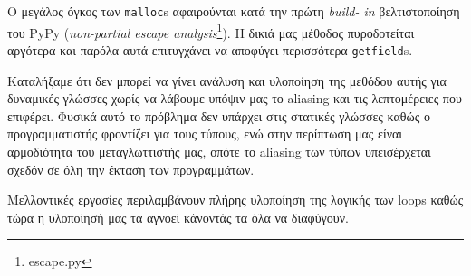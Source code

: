 Ο μεγάλος όγκος των \texttt{malloc}s αφαιρούνται κατά την πρώτη \textit{build-
in} βελτιστοποίηση του PyPy (\textit{non-partial escape
analysis}\footnote{escape.py}). Η δικιά μας μέθοδος πυροδοτείται αργότερα και
παρόλα αυτά επιτυγχάνει να αποφύγει περισσότερα \texttt{getfield}s.

Καταλήξαμε ότι δεν μπορεί να γίνει ανάλυση και υλοποίηση της μεθόδου αυτής για
δυναμικές γλώσσες χωρίς να λάβουμε υπόψιν μας το aliasing και τις λεπτομέρειες
που επιφέρει. Φυσικά αυτό το πρόβλημα δεν υπάρχει στις στατικές γλώσσες καθώς ο
προγραμματιστής φροντίζει για τους τύπους, ενώ στην περίπτωση μας είναι
αρμοδιότητα του μεταγλωττιστής μας, οπότε το aliasing των τύπων υπεισέρχεται
σχεδόν σε όλη την έκταση των προγραμμάτων.

Μελλοντικές εργασίες περιλαμβάνουν πλήρης υλοποίηση της λογικής των loops
καθώς τώρα η υλοποίησή μας τα αγνοεί κάνοντάς τα όλα να διαφύγουν.